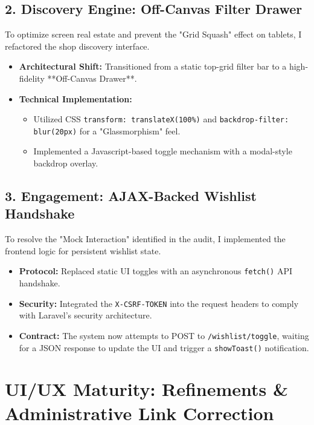 \documentclass[12pt,a4paper]{article}
\begin{document}
\subsection{2. Discovery Engine: Off-Canvas Filter Drawer}
To optimize screen real estate and prevent the "Grid Squash" effect on tablets, I refactored the shop discovery interface.
\begin{itemize}
    \item \textbf{Architectural Shift:} Transitioned from a static top-grid filter bar to a high-fidelity **Off-Canvas Drawer**.
    \item \textbf{Technical Implementation:} 
        \begin{itemize}
            \item Utilized CSS \texttt{transform: translateX(100\%)} and \texttt{backdrop-filter: blur(20px)} for a "Glassmorphism" feel.
            \item Implemented a Javascript-based toggle mechanism with a modal-style backdrop overlay.
        \end{itemize}
\end{itemize}

\subsection{3. Engagement: AJAX-Backed Wishlist Handshake}
To resolve the "Mock Interaction" identified in the audit, I implemented the frontend logic for persistent wishlist state.
\begin{itemize}
    \item \textbf{Protocol:} Replaced static UI toggles with an asynchronous \texttt{fetch()} API handshake.
    \item \textbf{Security:} Integrated the \texttt{X-CSRF-TOKEN} into the request headers to comply with Laravel's security architecture.
    \item \textbf{Contract:} The system now attempts to POST to \texttt{/wishlist/toggle}, waiting for a JSON response to update the UI and trigger a \texttt{showToast()} notification.
\end{itemize}

\section{UI/UX Maturity: Refinements \& Administrative Link Correction}
\end{document}
